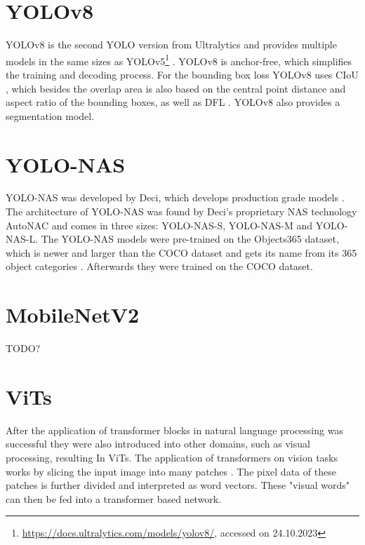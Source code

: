 \documentclass[10pt]{book}
\begin{document}
\section{YOLOv8}

\ac{YOLO}v8 is the second \ac{YOLO} version from Ultralytics and provides multiple models in the same sizes as \ac{YOLO}v5\footnote{\url{https://docs.ultralytics.com/models/yolov8/}, accessed on 24.10.2023} \cite{terven2023comprehensive}. \ac{YOLO}v8 is anchor-free, which simplifies the training and decoding process. For the bounding box loss \ac{YOLO}v8 uses \ac{CIoU} \cite{zheng2020distance}, which besides the overlap area is also based on the central point distance and aspect ratio of the bounding boxes, as well as \ac{DFL} \cite{li2020generalized}. \ac{YOLO}v8 also provides a segmentation model.

\section{YOLO-NAS}

\ac{YOLO}-NAS was developed by Deci, which develops production grade models \cite{terven2023comprehensive}. The architecture of \ac{YOLO}-NAS was found by Deci's proprietary \ac{NAS} technology AutoNAC and comes in three sizes: \ac{YOLO}-NAS-S, \ac{YOLO}-NAS-M and \ac{YOLO}-NAS-L. The \ac{YOLO}-NAS models were pre-trained on the Objects365 dataset, which is newer and larger than the COCO dataset and gets its name from its 365 object categories \cite{shao2019objects365}. Afterwards they were trained on the COCO dataset.

\section{MobileNetV2}

TODO?

\section{ViTs}

After the application of transformer blocks in natural language processing was successful they were also introduced into other domains, such as visual processing, resulting In \acp{ViT}. The application of transformers on vision tasks works by slicing the input image into many patches \cite{dosovitskiy2020image}. The pixel data of these patches is  further divided and interpreted as word vectors. These "visual words" can then be fed into a transformer based network. 
\end{document}
